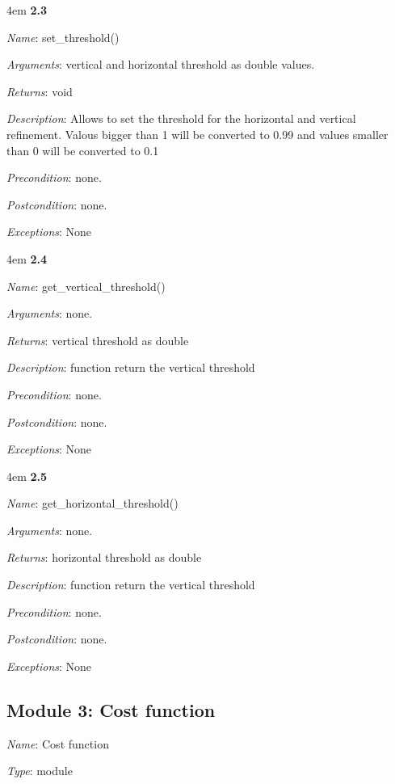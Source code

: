 \documentclass[notitlepage]{article}
\begin{document}
\begin{flushleft}
\par
\begingroup
\leftskip4em
\textbf{2.3} 

\textit{Name}: set\_threshold()

\textit{Arguments}: vertical and horizontal threshold as double values.

\textit{Returns}: void

\textit{Description}: Allows to set the threshold for the horizontal and vertical refinement. Valous bigger than 1 will be converted to 0.99 and values smaller than 0 will be converted to 0.1

\textit{Precondition}: none.

\textit{Postcondition}: none.

\textit{Exceptions}: None
\par
\endgroup

\par
\begingroup
\leftskip4em
\textbf{2.4} 

\textit{Name}: get\_vertical\_threshold()

\textit{Arguments}: none.

\textit{Returns}: vertical threshold as double

\textit{Description}: function return the vertical threshold

\textit{Precondition}: none.

\textit{Postcondition}: none.

\textit{Exceptions}: None
\par
\endgroup

\par
\begingroup
\leftskip4em
\textbf{2.5} 

\textit{Name}: get\_horizontal\_threshold()

\textit{Arguments}: none.

\textit{Returns}: horizontal threshold as double

\textit{Description}: function return the vertical threshold

\textit{Precondition}: none.

\textit{Postcondition}: none.

\textit{Exceptions}: None
\par
\endgroup


\subsection{Module 3: Cost function}
\textit{Name}: Cost function

\textit{Type}: module


\end{flushleft}
\end{document}

